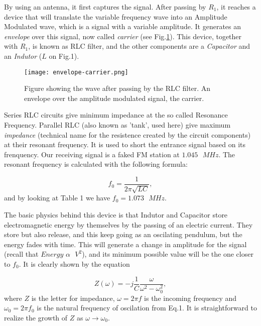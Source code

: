 \documentclass{article}
\begin{document}
By using an antenna, it first captures the signal. After passing by
$R_{1}$, it reaches a device that will translate the variable frequency
wave into an Amplitude Modulated wave, which is a signal with a variable
amplitude. It generates an \emph{envelope} over this signal, now called \emph{carrier} (see Fig.\ref{carrier-envelope}). This device, together with $R_{1}$, is known as RLC filter, and the other components are a \emph{Capacitor} and an \emph{Indutor} ($L$ on Fig.1). 

\begin{figure}[H]
\center
\texttt{[image: envelope-carrier.png]}
\caption {Figure showing the wave after passing by the RLC filter. An envelope over the amplitude modulated signal, the carrier.} 
\label{carrier-envelope}
\end{figure}

Series RLC circuits give minimum impedance at the so called Resonance Frequency. Parallel RLC (also known as 'tank', used here) give maximum \emph{impedance} (technical name for the resistence
created by the circuit components) at their resonant frequency. It is used to short the entrance signal based on its frenquency. Our receiving signal is a faked FM station at $1.045 \text{ }MHz$. The resonant frequency is calculated with the following formula:

\begin{equation}
f_{0}=\frac{1}{2 \pi \sqrt{LC}},
\label{eq:1}
\end{equation}
and by looking at Table 1 we have $f_{0}=1.073 \text{ }MHz$. 

The basic
physics behind this device is that Indutor and Capacitor store
electromagnetic energy by themselves by the passing of an electric
current. They store but also release, and this keep going as an
oscilating pendulum, but the energy fades with time. This will
generate a change in amplitude for the signal (recall that $Energy \text{
  }\alpha \text{ }V^{2}$), and its minimum possible value will be
the one closer to $f_{0}$. It is clearly shown by the equation

\begin{equation}
Z(\omega) = -j\frac{1}{C}\frac{\omega}{\omega^{2} - \omega^{2}_{0}},
\label{eq:1}
\end{equation}
where $Z$ is the letter for impedance, $\omega=2 \pi f$ is the incoming frequency and $\omega_{0}=2 \pi f_{0}$ is the natural frequency of oscilation from Eq.1. It is straightforward to realize the growth of $Z$ as $\omega \rightarrow \omega_{0}$.
\end{document}
